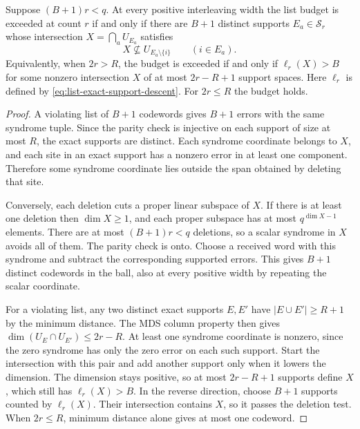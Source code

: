 \begin{theorem}
\label{thm:list-support-ranks}
Suppose \((B+1)r<q\). At every positive interleaving width the list budget
is exceeded at count \(r\) if and only if there are \(B+1\) distinct
supports \(E_a\in\mathcal S_r\) whose intersection \(X=\bigcap_a U_{E_a}\)
satisfies
\[
 X\nsubseteq U_{E_a\setminus\{i\}} \qquad (i\in E_a).
\]
Equivalently, when \(2r>R\), the budget is exceeded if and only if
\(\ell_r(X)>B\) for some nonzero intersection \(X\) of at most
\(2r-R+1\) support spaces. Here \(\ell_r\) is defined by
\eqref{eq:list-exact-support-descent}. For \(2r\le R\) the budget holds.
\end{theorem}

\begin{proof}
A violating list of \(B+1\) codewords gives \(B+1\) errors with the same
syndrome tuple. Since the parity check is injective on each support of
size at most \(R\), the exact supports are distinct. Each syndrome
coordinate belongs to \(X\), and each site in an exact support has a nonzero
error in at least one component. Therefore some syndrome coordinate
lies outside the span obtained by deleting that site.

Conversely, each deletion cuts a proper linear subspace of \(X\).
If there is at least one deletion then \(\dim X\ge1\), and each proper
subspace has at most \(q^{\dim X-1}\) elements. There are at most
\((B+1)r<q\) deletions, so a scalar syndrome in \(X\) avoids all of them.
The parity check is onto. Choose a received word with this syndrome and
subtract the corresponding supported errors. This gives \(B+1\) distinct
codewords in the ball, also at every positive width by repeating the
scalar coordinate.

For a violating list, any two distinct exact supports \(E,E'\) have
\(\lvert E\cup E'\rvert\ge R+1\) by the minimum distance. The MDS column
property then gives \(\dim(U_E\cap U_{E'})\le 2r-R\). At least one
syndrome coordinate is nonzero, since the zero syndrome has only the
zero error on each such support. Start the intersection with this pair
and add another support only when it lowers the dimension. The dimension
stays positive, so at most \(2r-R+1\) supports define \(X\), which still
has \(\ell_r(X)>B\). In the reverse direction, choose \(B+1\) supports
counted by \(\ell_r(X)\). Their intersection contains \(X\), so it passes
the deletion test. When \(2r\le R\),
minimum distance alone gives at most one codeword.
\end{proof}

